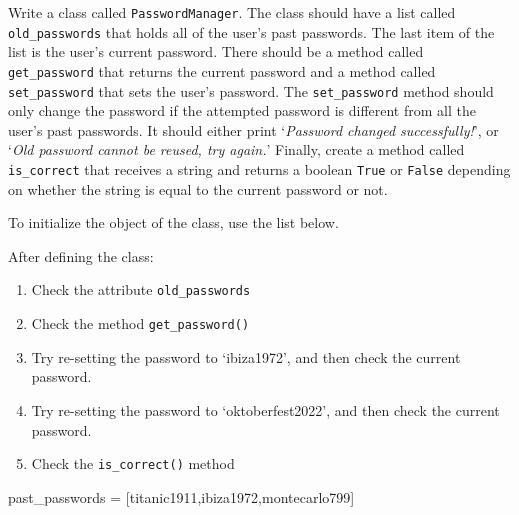 \documentclass[
  letterpaper,
  DIV=11,
  numbers=noendperiod]{scrreprt}
\newenvironment{Shaded}{\begin{snugshade}}{\end{snugshade}}
\newcommand{\NormalTok}[1]{\textcolor[rgb]{0.00,0.23,0.31}{#1}}
\newcommand{\OperatorTok}[1]{\textcolor[rgb]{0.37,0.37,0.37}{#1}}
\newcommand{\StringTok}[1]{\textcolor[rgb]{0.13,0.47,0.30}{#1}}
\begin{document}
Write a class called \texttt{PasswordManager}. The class should have a
list called \texttt{old\_passwords} that holds all of the user's past
passwords. The last item of the list is the user's current password.
There should be a method called \texttt{get\_password} that returns the
current password and a method called \texttt{set\_password} that sets
the user's password. The \texttt{set\_password} method should only
change the password if the attempted password is different from all the
user's past passwords. It should either print `\emph{Password changed
successfully!}', or `\emph{Old password cannot be reused, try again.}'
Finally, create a method called \texttt{is\_correct} that receives a
string and returns a boolean \texttt{True} or \texttt{False} depending
on whether the string is equal to the current password or not.

To initialize the object of the class, use the list below.

After defining the class:

\begin{enumerate}
\def\labelenumi{\arabic{enumi}.}
\item
  Check the attribute \texttt{old\_passwords}
\item
  Check the method \texttt{get\_password()}
\item
  Try re-setting the password to `ibiza1972', and then check the current
  password.
\item
  Try re-setting the password to `oktoberfest2022', and then check the
  current password.
\item
  Check the \texttt{is\_correct()} method
\end{enumerate}

\begin{Shaded}
\begin{Highlighting}[]
\NormalTok{past\_passwords }\OperatorTok{=}\NormalTok{ [}\StringTok{\textquotesingle{}titanic1911\textquotesingle{}}\NormalTok{,}\StringTok{\textquotesingle{}ibiza1972\textquotesingle{}}\NormalTok{,}\StringTok{\textquotesingle{}montecarlo799\textquotesingle{}}\NormalTok{]}
\end{Highlighting}
\end{Shaded}
\end{document}
